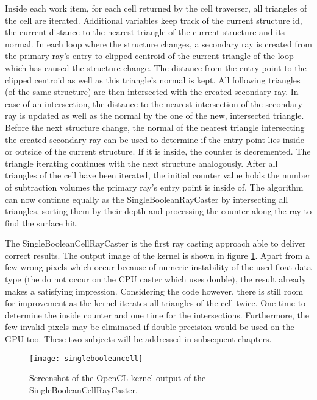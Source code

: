 Inside each work item, for each cell returned by the cell traverser, all triangles of the cell are iterated. Additional variables keep track of the current structure id, the current distance to the nearest triangle of the current structure and its normal. In each loop where the structure changes, a secondary ray is created from the primary ray's entry to clipped centroid of the current triangle of the loop which has caused the structure change. The distance from the entry point to the clipped centroid as well as this triangle's normal is kept. All following triangles (of the same structure) are then intersected with the created secondary ray. In case of an intersection, the distance to the nearest intersection of the secondary ray is updated as well as the normal by the one of the new, intersected triangle. Before the next structure change, the normal of the nearest triangle intersecting the created secondary ray can be used to determine if the entry point lies inside or outside of the current structure. If it is inside, the counter is decremented. The triangle iterating continues with the next structure analogously. After all triangles of the cell have been iterated, the initial counter value holds the number of subtraction volumes the primary ray's entry point is inside of. The algorithm can now continue equally as the SingleBooleanRayCaster by intersecting all triangles, sorting them by their depth and processing the counter along the ray to find the surface hit.

The SingleBooleanCellRayCaster is the first ray casting approach able to deliver correct results. The output image of the kernel is shown in figure \ref{fig:singlebooleancell}. Apart from a few wrong pixels which occur because of numeric instability of the used float data type (the do not occur on the CPU caster which uses double), the result already makes a satisfying impression. Considering the code however, there is still room for improvement as the kernel iterates all triangles of the cell twice. One time to determine the inside counter and one time for the intersections. Furthermore, the few invalid pixels may be eliminated if double precision would be used on the GPU too. These two subjects will be addressed in subsequent chapters.

\begin{figure}
\centering
\texttt{[image: singlebooleancell]}
\caption{Screenshot of the OpenCL kernel output of the SingleBooleanCellRayCaster.}
\label{fig:singlebooleancell}
\end{figure}

